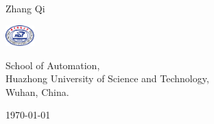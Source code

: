 \begin{frame}\label{Title}
    \vfill
    \centering
    \\
    \vspace{15pt}\\
    \begin{minipage}[m]{3cm}
        \Bold \small Zhang Qi
    \end{minipage}\hspace{-15pt}
    \begin{minipage}[m]{1.5cm}
        \centering
        \includegraphics[height=0.8cm]{Logos/HUSTLogoWithoutSubline.pdf}
    \end{minipage}
    \begin{minipage}[m]{0.55\textwidth}
        \Normal \scriptsize School of Automation,\\Huazhong University of Science and Technology,\\Wuhan, China.
    \end{minipage}
    \vfill
    \centering
    \today
\end{frame} 